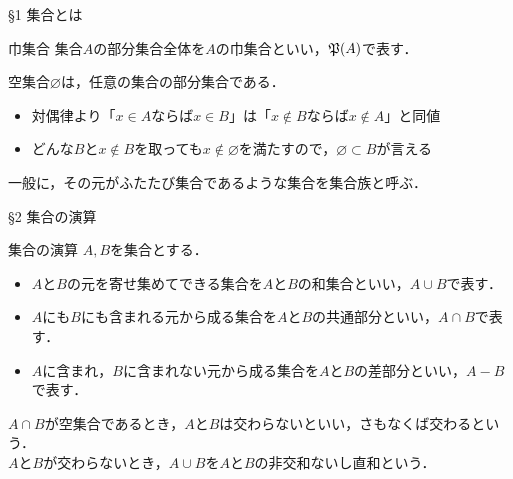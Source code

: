 \documentclass[uplatex,a4paper,dvipdfmx,aspectratio=169,11pt]{beamer}
\begin{document}
\begin{frame}[fragile]{\S 1 集合とは}
    \begin{block}{巾集合}
        集合$A$の部分集合全体を$A$の\alert{巾集合}といい，$\mathord{\mathfrak{P}}(A)$で表す．
    \end{block}
    \medskip
    
    空集合$\varnothing$は，任意の集合の部分集合である．
    \begin{itemize}
        \item 対偶律より「$x \in A$ならば$x \in B$」は「$x \notin B$ならば$x \notin A$」と同値
        \item どんな$B$と$x \notin B$を取っても$x \notin \varnothing$を満たすので，$\varnothing \subset B$が言える
    \end{itemize}
    \bigskip

    一般に，その元がふたたび集合であるような集合を\alert{集合族}と呼ぶ．
\end{frame}

\begin{frame}[fragile]{\S 2 集合の演算}
    \begin{block}{集合の演算}
        $A, B$を集合とする．
        \begin{itemize}
            \item $A$と$B$の元を寄せ集めてできる集合を$A$と$B$の\alert{和集合}といい，$A \cup B$で表す．
            \item $A$にも$B$にも含まれる元から成る集合を$A$と$B$の\alert{共通部分}といい，$A \cap B$で表す．
            \item $A$に含まれ，$B$に含まれない元から成る集合を$A$と$B$の\alert{差部分}といい，$A - B$で表す．
        \end{itemize}
    \end{block}

    $A \cap B$が空集合であるとき，$A$と$B$は\alert{交わらない}といい，さもなくば\alert{交わる}という．\\
    $A$と$B$が交わらないとき，$A \cup B$を$A$と$B$の\alert{非交和}ないし\alert{直和}という．
\end{frame}
\end{document}
